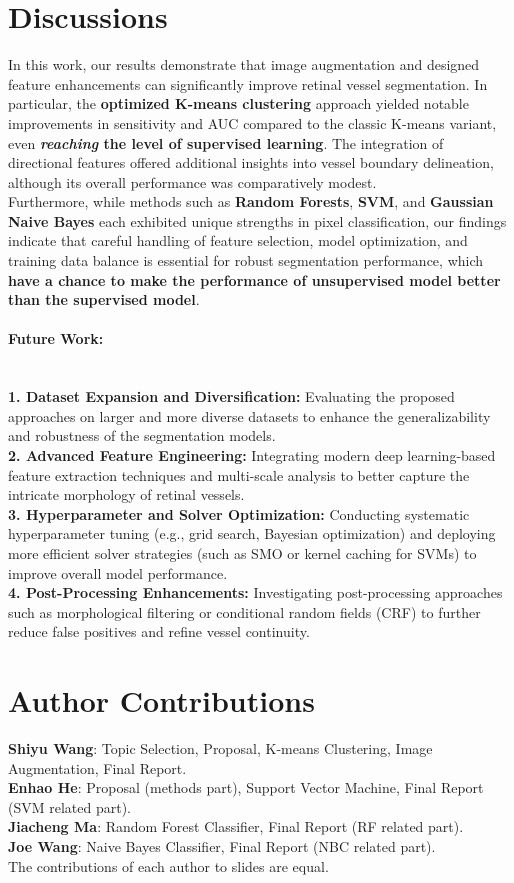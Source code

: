\documentclass[final]{article}
\begin{document}
\section{Discussions}
In this work, our results demonstrate that image augmentation and designed feature enhancements can significantly improve retinal vessel segmentation. In particular, the \textbf{optimized K-means clustering} approach yielded notable improvements in sensitivity and AUC compared to the classic K-means variant, even \textbf{\textit{reaching} the level of supervised learning}. The integration of directional features offered additional insights into vessel boundary delineation, although its overall performance was comparatively modest. \\
Furthermore, while methods such as \textbf{Random Forests}, \textbf{SVM}, and \textbf{Gaussian Naive Bayes} each exhibited unique strengths in pixel classification, our findings indicate that careful handling of feature selection, model optimization, and training data balance is essential for robust segmentation performance, which \textbf{have a chance to make the performance of unsupervised model better than the supervised model}. 
\paragraph{Future Work:} \hfill \\
\textbf{1. Dataset Expansion and Diversification:} Evaluating the proposed approaches on larger and more diverse datasets to enhance the generalizability and robustness of the segmentation models. \\
\textbf{2. Advanced Feature Engineering:} Integrating modern deep learning-based feature extraction techniques and multi-scale analysis to better capture the intricate morphology of retinal vessels. \\
\textbf{3. Hyperparameter and Solver Optimization:} Conducting systematic hyperparameter tuning (e.g., grid search, Bayesian optimization) and deploying more efficient solver strategies (such as SMO or kernel caching for SVMs) to improve overall model performance. \\
\textbf{4. Post-Processing Enhancements:} Investigating post-processing approaches such as morphological filtering or conditional random fields (CRF) to further reduce false positives and refine vessel continuity.


\newpage



\section{Author Contributions}
\textbf{Shiyu Wang}: Topic Selection, Proposal, K-means Clustering, Image Augmentation, Final Report. \\
\textbf{Enhao He}: Proposal (methods part), Support Vector Machine, Final Report (SVM related part). \\
\textbf{Jiacheng Ma}: Random Forest Classifier, Final Report (RF related part). \\
\textbf{Joe Wang}: Naive Bayes Classifier, Final Report (NBC related part). \\
The contributions of each author to slides are equal. 
\newpage
\end{document}
